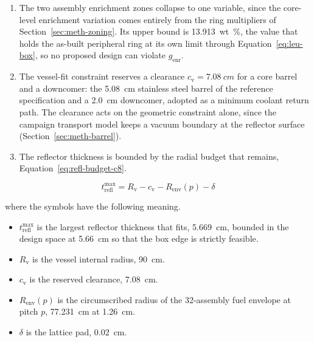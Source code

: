 \begin{enumerate}
  \item The two assembly enrichment zones collapse to one variable,
        since the core-level enrichment variation comes entirely from
        the ring multipliers of Section~\ref{sec:meth-zoning}. Its
        upper bound is \SI{13.913}{wt\%}, the value that holds the
        as-built peripheral ring at its own limit through
        Equation~\eqref{eq:leu-box}, so no proposed design can violate
        $g_\mathrm{enr}$.

  \item The vessel-fit constraint reserves a clearance
        $c_\mathrm{v} = \SI{7.08}{cm}$ for a core barrel and a
        downcomer: the \SI{5.08}{cm} stainless steel barrel of the
        reference specification and a \SI{2.0}{cm} downcomer, adopted
        as a minimum coolant return path. The clearance acts on the
        geometric constraint alone, since the campaign transport model
        keeps a vacuum boundary at the reflector surface
        (Section~\ref{sec:meth-barrel}).

  \item The reflector thickness is bounded by the radial budget that
        remains, Equation~\eqref{eq:refl-budget-c8}.
\end{enumerate}

\begin{equation}
t_\mathrm{refl}^{\max} = R_\mathrm{v} - c_\mathrm{v} - R_\mathrm{env}(p) - \delta
\label{eq:refl-budget-c8}
\end{equation}

\noindent where the symbols have the following meaning.

\begin{itemize}
  \item $t_\mathrm{refl}^{\max}$ is the largest reflector thickness that
        fits, \SI{5.669}{cm}, bounded in the design space at
        \SI{5.66}{cm} so that the box edge is strictly feasible.

  \item $R_\mathrm{v}$ is the vessel internal radius, \SI{90}{cm}.

  \item $c_\mathrm{v}$ is the reserved clearance, \SI{7.08}{cm}.

  \item $R_\mathrm{env}(p)$ is the circumscribed radius of the
        32-assembly fuel envelope at pitch $p$, \SI{77.231}{cm} at
        \SI{1.26}{cm}.

  \item $\delta$ is the lattice pad, \SI{0.02}{cm}.
\end{itemize}

